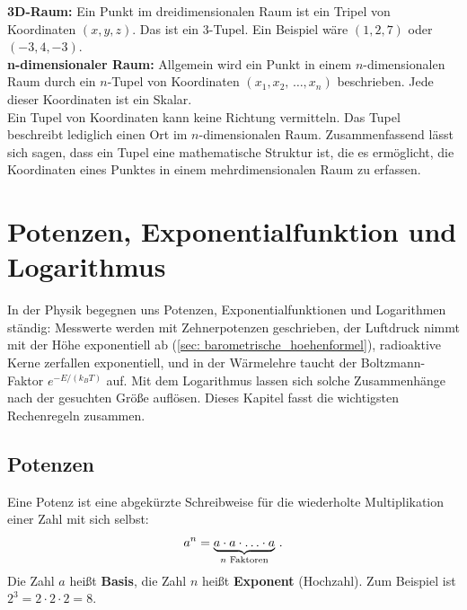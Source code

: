 \noindent\textbf{3D-Raum:} Ein Punkt im dreidimensionalen Raum ist ein Tripel von Koordinaten $(x,y,z)$. Das ist ein $3$-Tupel. Ein Beispiel wäre $(1,2,7)$ oder $(-3,4,-3)$.\\

\noindent\textbf{n-dimensionaler Raum:} Allgemein wird ein Punkt in einem $n$-dimensionalen Raum durch ein $n$-Tupel von Koordinaten $(x_1, x_2, \,\ldots, x_n)$ beschrieben. Jede dieser Koordinaten ist ein Skalar.\\

Ein Tupel von Koordinaten kann keine Richtung vermitteln. Das Tupel beschreibt lediglich einen Ort im $n$-dimensionalen Raum. Zusammenfassend lässt sich sagen, dass ein Tupel eine mathematische Struktur ist, die es ermöglicht, die Koordinaten eines Punktes in einem mehrdimensionalen Raum zu erfassen.

\newpage
\chapter{Potenzen, Exponentialfunktion und Logarithmus}\label{chap: Potenzen_Exp_Log}
In der Physik begegnen uns Potenzen, Exponentialfunktionen und Logarithmen ständig: Messwerte werden mit Zehnerpotenzen geschrieben, der Luftdruck nimmt mit der Höhe exponentiell ab (\cref{sec: barometrische_hoehenformel}), radioaktive Kerne zerfallen exponentiell, und in der Wärmelehre taucht der Boltzmann-Faktor $e^{-E/(k_B T)}$ auf. Mit dem Logarithmus lassen sich solche Zusammenhänge nach der gesuchten Größe auflösen. Dieses Kapitel fasst die wichtigsten Rechenregeln zusammen.

\section{Potenzen}\label{sec: Potenzen}
Eine Potenz ist eine abgekürzte Schreibweise für die wiederholte Multiplikation einer Zahl mit sich selbst:
\begin{equation}
    a^n = \underbrace{a \cdot a \cdot \ldots \cdot a}_{n \text{ Faktoren}} \,.
\end{equation}
Die Zahl $a$ heißt \textbf{Basis}, die Zahl $n$ heißt \textbf{Exponent} (Hochzahl). Zum Beispiel ist $2^3 = 2 \cdot 2 \cdot 2 = 8$.

